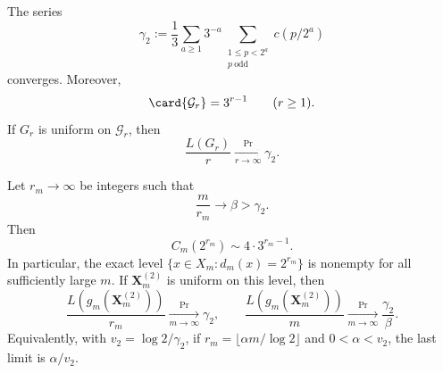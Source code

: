 \begin{theorem}
\label{thm:dyadic-exact-multiplier}
The series
\begin{equation}
 \gamma_2:=\frac13\sum_{a\ge1}3^{-a}
 \sum_{\substack{1\le p<2^a\\p\ \mathrm{odd}}}c(p/2^a)
 \label{eq:dyadic-cost-velocity}
\end{equation}
converges.  Moreover,
\[
 \card{\mathcal G_r}=3^{r-1}\qquad(r\ge1).
\]
If \(G_r\) is uniform on \(\mathcal G_r\), then
\begin{equation}
 \frac{L(G_r)}r\xrightarrow[r\to\infty]{\Pr}\gamma_2.
 \label{eq:dyadic-generator-bridge}
\end{equation}

Let \(r_m\to\infty\) be integers such that
\[
 \frac m{r_m}\longrightarrow\beta>\gamma_2.
\]
Then
\begin{equation}
 C_m(2^{r_m})\sim4\cdot3^{r_m-1}.
 \label{eq:dyadic-finite-window-count}
\end{equation}
In particular, the exact level \(\{x\in X_m:d_m(x)=2^{r_m}\}\) is nonempty
for all sufficiently large \(m\).  If \(\mathbf X_m^{(2)}\) is uniform on
this level, then
\begin{equation}
 \frac{L(g_m(\mathbf X_m^{(2)}))}{r_m}
 \xrightarrow[m\to\infty]{\Pr}\gamma_2,
 \qquad
 \frac{L(g_m(\mathbf X_m^{(2)}))}{m}
 \xrightarrow[m\to\infty]{\Pr}\frac{\gamma_2}{\beta}.
 \label{eq:dyadic-finite-window-bridge}
\end{equation}
Equivalently, with \(v_2=\log2/\gamma_2\), if
\(r_m=\lfloor\alpha m/\log2\rfloor\) and \(0<\alpha<v_2\), the last limit is
\(\alpha/v_2\).
\end{theorem}

